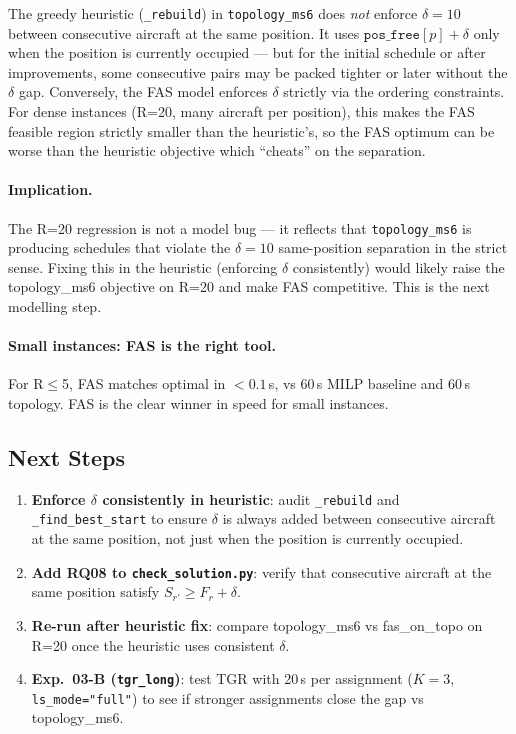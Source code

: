 The greedy heuristic (\texttt{\_rebuild}) in \texttt{topology\_ms6} does
\emph{not} enforce $\delta=10$ between consecutive aircraft at the same
position.  It uses $\texttt{pos\_free}[p] + \delta$ only when the position
is currently occupied — but for the initial schedule or after improvements,
some consecutive pairs may be packed tighter or later without the $\delta$
gap.  Conversely, the FAS model enforces $\delta$ strictly via the ordering
constraints.  For dense instances (R=20, many aircraft per position), this
makes the FAS feasible region strictly smaller than the heuristic's, so the
FAS optimum can be worse than the heuristic objective which ``cheats'' on
the separation.

\paragraph{Implication.}

The R=20 regression is not a model bug — it reflects that \texttt{topology\_ms6}
is producing schedules that violate the $\delta=10$ same-position separation
in the strict sense.  Fixing this in the heuristic (enforcing $\delta$ consistently)
would likely raise the topology\_ms6 objective on R=20 and make FAS competitive.
This is the next modelling step.

\paragraph{Small instances: FAS is the right tool.}

For R$\leq$5, FAS matches optimal in $<0.1$\,s, vs 60\,s MILP baseline
and 60\,s topology.  FAS is the clear winner in speed for small instances.

\subsection{Next Steps}
\label{exp:exp03-next}

\begin{enumerate}[noitemsep]
    \item \textbf{Enforce $\delta$ consistently in heuristic}: audit
          \texttt{\_rebuild} and \texttt{\_find\_best\_start} to ensure
          $\delta$ is always added between consecutive aircraft at the
          same position, not just when the position is currently occupied.
    \item \textbf{Add RQ08 to \texttt{check\_solution.py}}: verify that
          consecutive aircraft at the same position satisfy
          $S_{r'} \geq F_r + \delta$.
    \item \textbf{Re-run after heuristic fix}: compare topology\_ms6 vs
          fas\_on\_topo on R=20 once the heuristic uses consistent $\delta$.
    \item \textbf{Exp.~03-B (\texttt{tgr\_long})}: test TGR with 20\,s per
          assignment ($K=3$, \texttt{ls\_mode="full"}) to see if stronger
          assignments close the gap vs topology\_ms6.
\end{enumerate}
